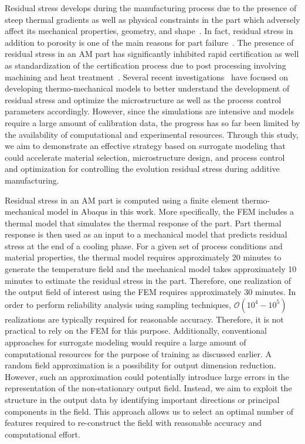 Residual stress develops during the manufacturing process due to the presence of steep thermal gradients as
well as physical constraints in the part which adversely affect its mechanical properties, geometry, and 
shape~\cite{Withers:2001,Mercelis:2006,Hofmann:2014}. 
In fact, residual stress in addition to porosity is one of the main reasons for 
part failure~\cite{Kim:2018}. The presence of residual stress in an AM part has significantly 
inhibited rapid certification as well as standardization of the certification process
due to post processing involving machining and heat treatment~\cite{Shiomi:2004}.
Several recent investigations~\cite{Vastola:2016,Hodge:2016,Williams:2018}
have focused on developing thermo-mechanical
models to better understand the development of residual stress and optimize the microstructure as well as
the process control parameters accordingly. However, since the simulations are intensive and models require a 
large amount of calibration data, the progress has so far been limited by the availability
of computational and experimental resources. Through this study, we aim to demonstrate an effective strategy
based on surrogate modeling that could accelerate material selection, microstructure design, and
process control and optimization for controlling the evolution residual stress during additive manufacturing. 

Residual stress in an AM part is computed using a finite element thermo-mechanical model in Abaqus in this work. 
More specifically, the FEM includes a thermal model that simulates the thermal response of the
part. Part thermal response is then used as an input to a mechanical model that predicts residual stress at the end
of a cooling phase. For a given set of process conditions and material properties, the thermal model requires
approximately 20 minutes to generate the temperature field and the mechanical model takes approximately 10
minutes to estimate the residual stress in the part. Therefore, one realization of the output field of interest
using the FEM requires approximately 30 minutes. In order to perform reliability analysis using
sampling techniques, $\mathcal{O}(10^4-10^5)$ realizations are typically required for reasonable accuracy.  
Therefore, it is not practical
to rely on the FEM for this purpose. Additionally, conventional approaches for surrogate
modeling would require a large amount of computational resources for the purpose of training as discussed earlier.
 A random field approximation is a possibility for
output dimension reduction. However, such an approximation could potentially introduce large errors in the  
representation of the non-stationary output field. Instead, we aim to exploit the structure in the output data 
by identifying important 
directions or principal components in the field. This approach allows us to select an optimal number of 
features required to re-construct the field with reasonable accuracy and computational effort. 

